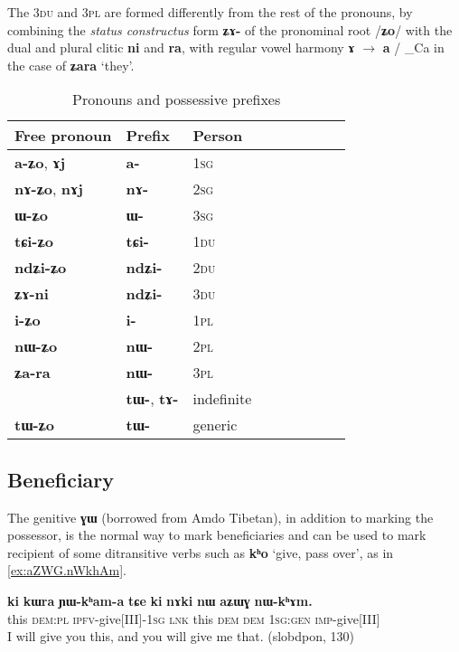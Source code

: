 \documentclass[oldfontcommands,oneside,a4paper,11pt]{article}
\newcommand{\ipa}[1]{\mbox{\phon\textbf{#1}}} %
\begin{document}
The \textsc{3du} and \textsc{3pl} are formed differently from the rest of the pronouns, by combining the \textit{status constructus} form \ipa{ʑɤ-} of the pronominal root /\ipa{ʑo}/ with the dual and plural clitic \ipa{ni} and \ipa{ra}, with regular vowel harmony \ipa{ɤ} $\rightarrow$ \ipa{a} / \_Ca in the case of \ipa{ʑara} `they'.
 
 \begin{table}[H] \centering
\caption{Pronouns and possessive prefixes }\label{tab:pronoun}
\begin{tabular}{lllllllll} 
\toprule
 Free pronoun & Prefix & Person\\
\midrule
 \ipa{a-ʑo},    \ipa{ɤj} &	\ipa{a-}  &		1\textsc{sg} \\
\ipa{nɤ-ʑo},  \ipa{nɤj} &	\ipa{nɤ-}  &			2\textsc{sg}\\
\ipa{ɯ-ʑo}  &	\ipa{ɯ-}  &			3\textsc{sg}\\
\midrule
\ipa{tɕi-ʑo}  &	\ipa{tɕi-}  &			1\textsc{du} \\
\ipa{ndʑi-ʑo}  &	\ipa{ndʑi-}  &		2\textsc{du} \\	
\ipa{ʑɤ-ni}  &	\ipa{ndʑi-}  &		3\textsc{du} \\	
\midrule
\ipa{i-ʑo}    &	\ipa{i-}  &			1\textsc{pl} \\
\ipa{nɯ-ʑo}   &	\ipa{nɯ-}  &			2\textsc{pl} \\
\ipa{ʑa-ra}  &	\ipa{nɯ-}  &			3\textsc{pl} \\
\midrule
&  \ipa{tɯ-},  \ipa{tɤ-} & indefinite \\
\ipa{tɯ-ʑo} & \ipa{tɯ-}   &  generic\\
\bottomrule
\end{tabular}
\end{table}
 
 

 
 \subsection{Beneficiary}  \label{sec:benef}
The genitive \ipa{ɣɯ} (borrowed from Amdo Tibetan), in addition to marking the possessor, is the normal way to mark beneficiaries and can be used to mark recipient of some ditransitive verbs such as \ipa{kʰo} `give, pass over', as in \ref{ex:aZWG.nWkhAm}.

\begin{exe}
\ex \label{ex:aZWG.nWkhAm}
\gll
\ipa{ki} 	\ipa{kɯra} 	\ipa{ɲɯ-kʰam-a} 	\ipa{tɕe} 	\ipa{ki} 	\ipa{nɤki} 	\ipa{nɯ} 	\ipa{aʑɯɣ} 	\ipa{nɯ-kʰɤm.} \\
this \textsc{dem:pl} \textsc{ipfv}-give[III]-\textsc{1sg} \textsc{lnk} this \textsc{dem} \textsc{dem} \textsc{1sg:gen} \textsc{imp}-give[III] \\
\glt I will give you this, and you will give me that. (slobdpon, 130)
\end{exe}
\end{document}
